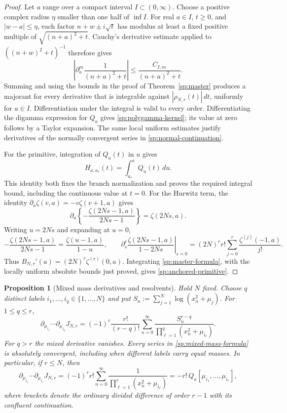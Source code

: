 \documentclass[11pt,letterpaper]{article}
\numberwithin{equation}{section}
\newtheorem{proposition}[theorem]{Proposition}
\theoremstyle{definition}
\theoremstyle{remark}
\begin{document}
\begin{proof}
Let $a$ range over a compact interval $I\subset(0,\infty)$.
Choose a positive complex radius $\eta$ smaller than one half of
$\inf I$.  For real $a\in I$, $t\geq0$, and $|w-a|\leq\eta$,
each factor $n+w\pm i\sqrt t$ has modulus at least a fixed
positive multiple of $\sqrt{(n+a)^2+t}$.  Cauchy's derivative
estimate applied to $((n+w)^2+t)^{-1}$ therefore gives
\[
 \left|\partial_a^m\frac{1}{(n+a)^2+t}\right|
 \leq\frac{C_{I,m}}{(n+a)^2+t}.
\]
Summing and using the bounds in the proof of
Theorem~\ref{sp:master} produces a majorant for every derivative
that is integrable against $|\rho_{N,r}(t)|\,dt$, uniformly for
$a\in I$.  Differentiation under the integral is valid to every
order.  Differentiating the digamma expression for $Q_a$ gives
\eqref{sp:polygamma-kernel}; its value at zero follows by a Taylor
expansion.  The same local uniform estimates justify derivatives
of the normally convergent series in
\eqref{sp:normal-continuation}.

For the primitive, integration of $Q_u(t)$ in $u$ gives
\[
 H_{a,a_*}(t)=\int_{a_*}^{a}Q_u(t)\,du.
\]
This identity both fixes the branch normalization and proves the
required integral bound, including the continuous value at $t=0$.
For the Hurwitz term, the identity
$\partial_a\zeta(v,a)=-v\zeta(v+1,a)$ gives
\[
 \partial_a\left\{-\frac{\zeta(2Ns-1,a)}{2Ns-1}\right\}
 =\zeta(2Ns,a).
\]
Writing $u=2Ns$ and expanding at $u=0$,
\[
 -\frac{\zeta(2Ns-1,a)}{2Ns-1}
 =\frac{\zeta(u-1,a)}{1-u},\qquad
 \left.\partial_s^r
    \frac{\zeta(2Ns-1,a)}{1-2Ns}\right|_{s=0}
 =(2N)^r r!\sum_{j=0}^{r}\frac{\zeta^{(j)}(-1,a)}{j!}.
\]
Thus $B_{N,r}'(a)=(2N)^r\zeta^{(r)}(0,a)$.
Integrating \eqref{sp:master-formula}, with the locally uniform
absolute bounds just proved, gives
\eqref{sp:anchored-primitive}.
\end{proof}

\begin{proposition}[Mixed mass derivatives and resolvents]
\label{sp:mass-derivatives}
Hold $N$ fixed.  Choose $q$ distinct labels
$i_1,\ldots,i_q\in\{1,\ldots,N\}$ and put
$S_n:=\sum_{j=1}^{N}\log(x_n^2+\mu_j)$.
For $1\leq q\leq r$,
\begin{equation}
 \partial_{\mu_{i_1}}\cdots\partial_{\mu_{i_q}}J_{N,r}
 =(-1)^r\frac{r!}{(r-q)!}
   \sum_{n=0}^{\infty}
     \frac{S_n^{r-q}}{\prod_{\ell=1}^{q}(x_n^2+\mu_{i_\ell})}.
 \label{sp:mixed-mass-formula}
\end{equation}
For $q>r$ the mixed derivative vanishes.  Every series in
\eqref{sp:mixed-mass-formula} is absolutely convergent, including
when different labels carry equal masses.
In particular, if $r\leq N$, then
\begin{equation}
 \partial_{\mu_{i_1}}\cdots\partial_{\mu_{i_r}}J_{N,r}
 =(-1)^r r!\sum_{n=0}^{\infty}
          \frac{1}{\prod_{\ell=1}^{r}(x_n^2+\mu_{i_\ell})}
 =-r!\,Q_a[\mu_{i_1},\ldots,\mu_{i_r}],
 \label{sp:rational-mass-resolvent}
\end{equation}
where brackets denote the ordinary divided difference of order
$r-1$ with its confluent continuation.
\end{proposition}
\end{document}
